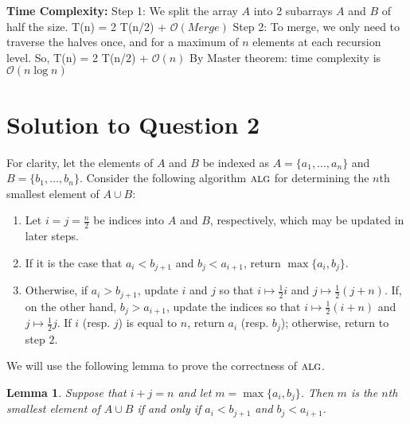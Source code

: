 \documentclass[11pt]{article}
\renewcommand{\O}{\mathcal{O}}
\newcommand{\alg}{\textsc{alg}}
\newtheorem{lemma}[theorem]{Lemma}
\begin{document}
{\bf Time Complexity:}\newline
Step 1: We split the array $A$ into 2 subarrays $A$ and $B$ of half the size. 
T(n) = 2 T(n/2) + $\O(Merge)$ \newline
Step 2: To merge, we only need to traverse the halves once, and for a maximum of $n$ elements at each recursion level. \newline
So, T(n) = 2 T(n/2) + $\O(n)$ \newline
By Master theorem: time complexity is $\O(n \log n)$ \newline

\section{Solution to Question 2}

For clarity, let the elements of $A$ and $B$ be indexed as $A = \{a_1, \dots, a_n\}$ and $B = \{b_1, \dots, b_n\}$.
Consider the following algorithm $\alg$ for determining the $n$th smallest element of $A \cup B$:
\begin{enumerate}
  \item Let $i = j = \frac{n}{2}$ be indices into $A$ and $B$, respectively, which may be updated in later steps.
  \item If it is the case that $a_i < b_{j+1}$ and $b_j < a_{i+1}$, return $\max \{a_i, b_j\}$.
  \item Otherwise, if $a_i > b_{j+1}$, update $i$ and $j$ so that $i \mapsto \frac{1}{2}i$ and $j \mapsto \frac{1}{2}(j + n)$.
    If, on the other hand, $b_j > a_{i+1}$, update the indices so that $i \mapsto \frac{1}{2}(i + n)$ and $j \mapsto \frac{1}{2}j$.
    If $i$ (resp. $j$) is equal to $n$, return $a_i$ (resp. $b_j$); otherwise, return to step $2$.
\end{enumerate}
We will use the following lemma to prove the correctness of $\alg$.

\begin{lemma}\label{nth-smallest-lemma}
Suppose that $i + j = n$ and let $m = \max \{a_i, b_j\}$. Then $m$ is the $n$th smallest element of $A \cup B$ if and only if $a_i < b_{j+1}$ and $b_j < a_{i+1}$.
\end{lemma}
\end{document}

